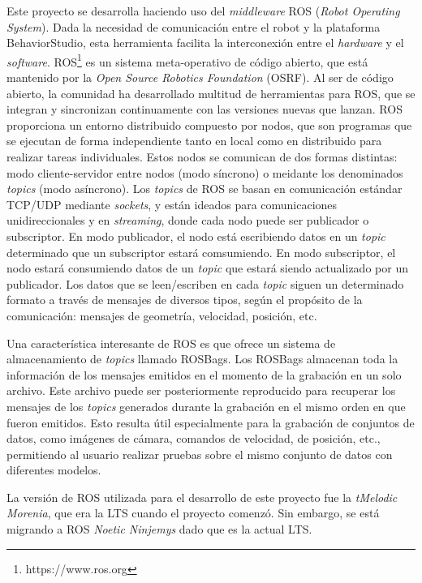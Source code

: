 Este proyecto se desarrolla haciendo uso del \textit{middleware} ROS (\textit{Robot Operating System}). Dada la necesidad de comunicación entre el robot y la plataforma BehaviorStudio, esta herramienta facilita la interconexión entre el \textit{hardware} y el \textit{software}.
ROS\footnote{https://www.ros.org} es un sistema meta-operativo de código abierto, que está mantenido por la \textit{Open Source Robotics Foundation} (OSRF). Al ser de código abierto, la comunidad ha desarrollado multitud de herramientas para ROS, que se integran y sincronizan continuamente con las versiones nuevas que lanzan. ROS proporciona un entorno distribuido compuesto por nodos, que son programas que se ejecutan de forma independiente tanto en local como en distribuido para realizar tareas individuales. Estos nodos se comunican de dos formas distintas: modo cliente-servidor entre nodos (modo síncrono) o meidante los denominados \textit{topics} (modo asíncrono). Los \textit{topics} de ROS se basan en comunicación estándar TCP/UDP mediante \textit{sockets}, y están ideados para comunicaciones unidireccionales y en \textit{streaming}, donde cada nodo puede ser publicador o subscriptor. En modo publicador, el nodo está escribiendo datos en un \textit{topic} determinado que un subscriptor estará comsumiendo. En modo subscriptor, el nodo estará consumiendo datos de un \textit{topic} que estará siendo actualizado por un publicador. Los datos que se leen/escriben en cada \textit{topic} siguen un determinado formato a través de mensajes de diversos tipos, según el propósito de la comunicación: mensajes de geometría, velocidad, posición, etc.

Una característica interesante de ROS es que ofrece un sistema de almacenamiento de \textit{topics} llamado ROSBags. Los ROSBags almacenan toda la información de los mensajes emitidos en el momento de la grabación en un solo archivo. Este archivo puede ser posteriormente reproducido para recuperar los mensajes de los \textit{topics} generados durante la grabación en el mismo orden en que fueron emitidos. Esto resulta útil especialmente para la grabación de conjuntos de datos, como imágenes de cámara, comandos de velocidad, de posición, etc., permitiendo al usuario realizar pruebas sobre el mismo conjunto de datos con diferentes modelos.

La versión de ROS utilizada para el desarrollo de este proyecto fue la \textit{tMelodic Morenia}, que era la LTS cuando el proyecto comenzó. Sin embargo, se está migrando a ROS \textit{Noetic Ninjemys} dado que es la actual LTS.


